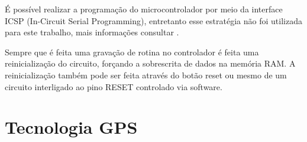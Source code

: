 É possível realizar a programação do microcontrolador por meio da interface ICSP (In-Circuit Serial Programming), entretanto esse estratégia não foi utilizada para este trabalho, mais informações consultar \textcite{arduino_icsp:2013}.

Sempre que é feita uma gravação de rotina no controlador é feita uma reinicialização do circuito, forçando a sobrescrita de dados na memória RAM. A reinicialização também pode ser feita através do botão reset ou mesmo de um circuito interligado ao pino RESET controlado via software.

\section{Tecnologia GPS}
